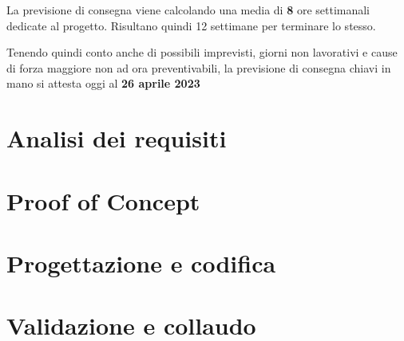 La previsione di consegna viene calcolando una media di \textbf{8} ore settimanali dedicate al progetto. Risultano quindi 12 settimane per terminare lo stesso.

Tenendo quindi conto anche di possibili imprevisti, giorni non lavorativi e cause di forza maggiore non ad ora preventivabili, la previsione di consegna chiavi in mano si attesta oggi al \textbf{26 aprile 2023}

\section{Analisi dei requisiti}

\section{Proof of Concept}

\section{Progettazione e codifica}

\section{Validazione e collaudo}